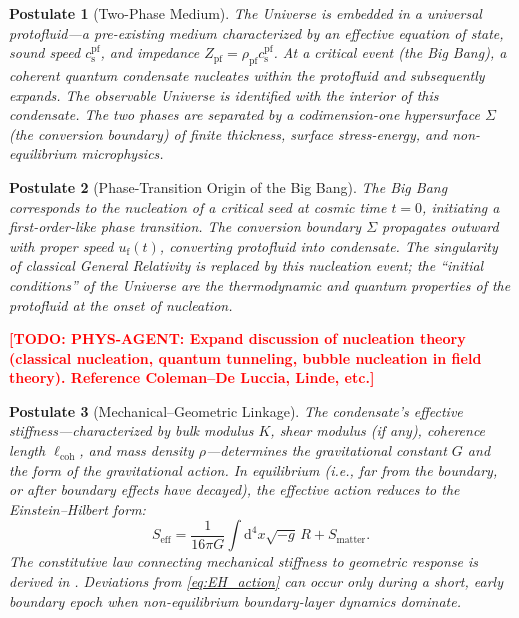 \documentclass[11pt,a4paper]{article}
\newcommand{\dx}{\mathrm{d}}
\newcommand{\cs}{c_{\mathrm{s}}}
\newcommand{\Zpf}{Z_{\mathrm{pf}}}
\newcommand{\uf}{u_{\mathrm{f}}}
\newtheorem{postulate}{Postulate}
\theoremstyle{definition}
\newcommand{\TODO}[1]{\textcolor{red}{\textbf{[TODO: #1]}}}
\begin{document}
\begin{postulate}[Two-Phase Medium]
\label{post:two_phase}
The Universe is embedded in a \emph{universal protofluid}---a pre-existing medium characterized by an effective equation of state, sound speed $\cs^{\mathrm{pf}}$, and impedance $\Zpf = \rho_{\mathrm{pf}} \cs^{\mathrm{pf}}$. At a critical event (the Big Bang), a \emph{coherent quantum condensate} nucleates within the protofluid and subsequently expands. The observable Universe is identified with the interior of this condensate. The two phases are separated by a codimension-one hypersurface $\Sigma$ (the \emph{conversion boundary}) of finite thickness, surface stress-energy, and non-equilibrium microphysics.
\end{postulate}

\begin{postulate}[Phase-Transition Origin of the Big Bang]
\label{post:phase_transition}
The Big Bang corresponds to the \emph{nucleation of a critical seed} at cosmic time $t = 0$, initiating a first-order-like phase transition. The conversion boundary $\Sigma$ propagates outward with proper speed $\uf(t)$, converting protofluid into condensate. The singularity of classical General Relativity is replaced by this nucleation event; the ``initial conditions'' of the Universe are the thermodynamic and quantum properties of the protofluid at the onset of nucleation.
\end{postulate}

\TODO{PHYS-AGENT: Expand discussion of nucleation theory (classical nucleation, quantum tunneling, bubble nucleation in field theory). Reference Coleman--De Luccia, Linde, etc.}

\begin{postulate}[Mechanical--Geometric Linkage]
\label{post:mech_geo}
The condensate's effective stiffness---characterized by bulk modulus $K$, shear modulus (if any), coherence length $\ell_{\mathrm{coh}}$, and mass density $\rho$---determines the gravitational constant $G$ and the form of the gravitational action. In equilibrium (i.e., far from the boundary, or after boundary effects have decayed), the effective action reduces to the Einstein--Hilbert form:
\begin{equation}
\label{eq:EH_action}
S_{\mathrm{eff}} = \frac{1}{16\pi G} \int \dx^4 x \sqrt{-g} \, R + S_{\mathrm{matter}}.
\end{equation}
The constitutive law connecting mechanical stiffness to geometric response is derived in \cite{SkavbergMechG2025,SkavbergMechGR2025}. Deviations from \eqref{eq:EH_action} can occur only during a short, early boundary epoch when non-equilibrium boundary-layer dynamics dominate.
\end{postulate}
\end{document}
